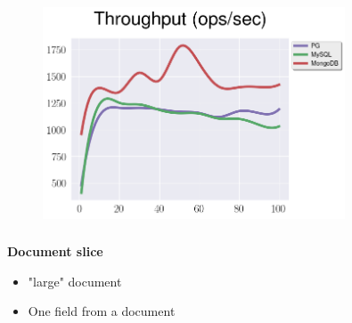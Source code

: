 \documentclass[usenames,dvipsnames, 18pt, compress, aspectratio=169]{beamer}
\begin{document}
\begin{frame}
    \frametitle{}
    \begin{center}
    \vspace{10pt}
    \begin{figure}
        \includegraphics[width=0.8\textwidth,center]{benchmarks/update_btree_large_throughput.png}
    \end{figure}
    \end{center}
\end{frame}

\begin{frame}
    \frametitle{}
    \begin{center}
        \textbf{Document slice}
        \begin{itemize}[label={}]
            \item "large" document
            \item One field from a document
        \end{itemize}
    \end{center}
\end{frame}

\fontsize{17pt}{19}\selectfont
{}
\end{document}
